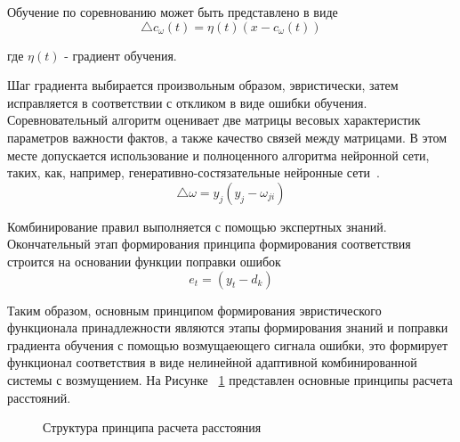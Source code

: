 Обучение по соревнованию может быть представлено в виде
\begin{equation}
    \label{eq:equation60}
     \bigtriangleup c_\omega(t) = \eta(t)(x-c_\omega(t))
\end{equation}

где $\eta(t)$ - градиент обучения.

Шаг градиента выбирается произвольным образом, эвристически, затем исправляется в соответствии с откликом в виде ошибки обучения. Соревновательный алгоритм оценивает две матрицы весовых характеристик параметров важности фактов, а также качество связей между матрицами. В этом месте допускается использование и полноценного алгоритма нейронной сети, таких, как, например, генеративно-состязательные нейронные сети~\cite{Goodfellow}.
\begin{equation}
    \label{eq:equation61}
     \bigtriangleup \omega = y_j(y_j - \omega_{ji})
\end{equation}

Комбинирование правил выполняется с помощью экспертных знаний. Окончательный этап формирования принципа формирования соответствия строится на основании функции поправки ошибок
\begin{equation}
    \label{eq:equation62}
     e_t = (y_t - d_k)
\end{equation}

Таким образом, основным принципом формирования эвристического функционала принадлежности являются этапы формирования знаний и поправки градиента обучения с помощью возмущаеющего сигнала ошибки, это формирует функционал соответствия в виде нелинейной адаптивной комбинированной системы с возмущением. 
На Рисунке ~\cref{fig:FLmetrics} представлен основные принципы расчета расстояний. 
\begin{figure}[ht]
    \caption{Структура принципа расчета расстояния}\label{fig:FLmetrics}
\end{figure}
